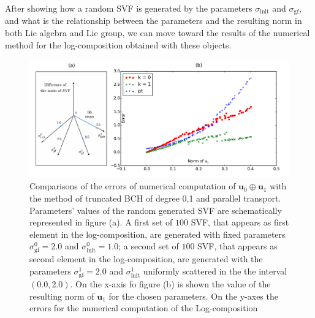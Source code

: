 After showing how a random SVF is generated by the parameters $\sigma_{\text{init}}$ and $\sigma_{\text{gf}}$, and what is the relationship between the parameters and the resulting norm in both Lie algebra and Lie group, we can move toward the results of the numerical method for the log-composition obtained with these objects.

\begin{figure}[!ht]
	\hspace{-1.5cm}
	\includegraphics[scale=0.6]{figures/SVF_scatter_plot.pdf}
	\caption{Comparisons of the errors of numerical computation of $\mathbf{u}_0\oplus \mathbf{u}_1$ with the method of truncated BCH of degree 0,1 and parallel transport. Parameters' values of the random generated SVF are schematically represented in figure (a). A first set of $100$ SVF, that appears as first element in the log-composition, are generated with fixed parameters $\sigma_{\text{gf}}^{0} = 2.0$ and $\sigma_{\text{init}}^{0} = 1.0$; a second set of $100$ SVF, that appears as second element in the log-composition, are generated with the parameters $\sigma_{\text{gf}}^{1} = 2.0$ and $\sigma_{\text{init}}^{1}$ uniformly scattered in the the interval $(0.0, 2.0)$. On the x-axis fo figure (b) is shown the value of the resulting norm of $\mathbf{u}_1$ for the chosen parameters. On the y-axes the errors for the numerical computation of the Log-composition  }
	\label{fig:SVF_scatter_plot}
\end{figure}

